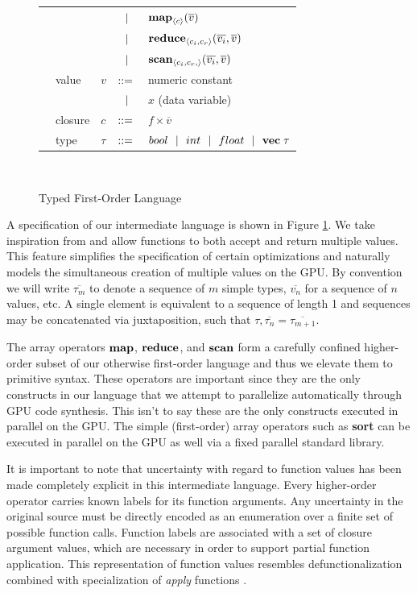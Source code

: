 \documentclass[preprint]{sigplanconf}
\begin{document}
\begin{figure}[h!]
\begin{tabular}{| m{0.01cm}m{1.3cm}m{0.1cm}m{0.2cm}p{5.0cm} |}
  &            &     & $\ \ | \ \ $    & $\mbox{\textbf{map}} _{\left\langle c \right\rangle}(\overline{v})$ \\[2pt]
  &            &     & $\ \ | \ \ $    & $\mbox{\textbf{reduce}} _{ \left\langle c_i, c_r \right\rangle } (\overline{v_i}, \overline{v})$ \\[2pt]
  &            &     & $\ \ | \ \ $    & $\mbox{\textbf{scan}} _{ \left\langle c_i, c_r, \right\rangle} (\overline{v_i}, \overline{v})$ \\[5pt]
  & value      & $v$ & $::=$ & numeric constant \\[2pt]
  &            &     & $\ \ | \ \ $    &  $x$  \quad \small{(data variable)} \\[2pt]
  & closure    & $c$ & $::=$ & $f \times \overline{v}$ \\[4pt]
  & type & $\tau$    & $::=$ & $bool \ \ | \ \  int \ \ | \ \  float \ \ | \ \  \mathbf{vec} \; \tau   $\\[5pt]
  \hline
  \end{tabular}\\[4pt]
  \caption{Typed First-Order Language}
  \label{TIL}
\end{figure} 

A specification of our intermediate language is shown in Figure \ref{TIL}. We take inspiration from \cite{Bol09} and allow functions to both accept and return multiple values. This feature simplifies the specification of certain optimizations and naturally models the simultaneous creation of multiple values on the GPU. By convention we will write $\overline{\tau_m}$ to denote a sequence of $m$ simple types, $\overline{v_n}$ for a sequence  of $n$ values, etc. A single element is equivalent to a sequence of length 1 and sequences may be concatenated via juxtaposition, such that $\tau, \overline{\tau_n} = \overline{\tau_{m+1}}$.

The array operators $\mbox{\textbf{map}}$, $\mbox{\textbf{reduce}}$, and $\mbox{\textbf{scan}}$ form a carefully confined higher-order subset of our otherwise first-order language and thus we elevate them to primitive syntax. These operators are important since they are the only constructs in our language that we attempt to parallelize automatically through GPU code synthesis. This isn't to say these are the only constructs executed in parallel on the GPU. The simple (first-order) array operators such as \textbf{sort} can be executed in parallel on the GPU as well via a fixed parallel standard library. 


It is important to note that uncertainty with regard to function values has been made completely explicit in this intermediate language. Every higher-order operator carries known labels for its function arguments. Any uncertainty in the original source must be directly encoded as an enumeration over a finite set of possible function calls. Function labels are associated with a set of closure argument values, which are necessary in order to support partial function application. This representation of function values resembles defunctionalization combined with specialization of \textit{apply} functions \cite{Tolmach98}. 
\end{document}
